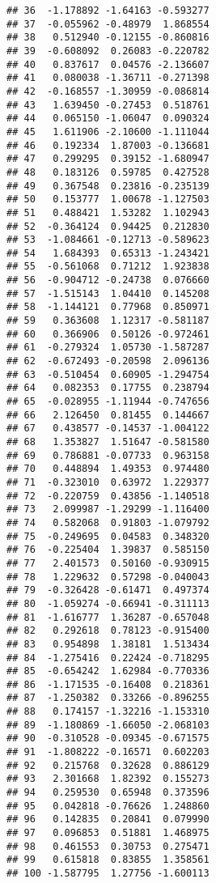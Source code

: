 \documentclass[12pt,a4paper]{scrartcl}\usepackage[]{graphicx}\usepackage[]{color}
\makeatletter
\newenvironment{kframe}{%
 \def\at@end@of@kframe{}%
 \ifinner\ifhmode%
  \def\at@end@of@kframe{\end{minipage}}%
  \begin{minipage}{\columnwidth}%
 \fi\fi%
 \def\FrameCommand##1{\hskip\@totalleftmargin \hskip-\fboxsep
 \colorbox{shadecolor}{##1}\hskip-\fboxsep
     \hskip-\linewidth \hskip-\@totalleftmargin \hskip\columnwidth}%
 \MakeFramed {\advance\hsize-\width
   \@totalleftmargin\z@ \linewidth\hsize
   \@setminipage}}%
 {\par\unskip\endMakeFramed%
 \at@end@of@kframe}
\newenvironment{knitrout}{}{} %
\makeatother
\begin{document}
\begin{Answer}
\begin{knitrout}
\begin{kframe}
\begin{verbatim}
## 36  -1.178892 -1.64163 -0.593277
## 37  -0.055962 -0.48979  1.868554
## 38   0.512940 -0.12155 -0.860816
## 39  -0.608092  0.26083 -0.220782
## 40   0.837617  0.04576 -2.136607
## 41   0.080038 -1.36711 -0.271398
## 42  -0.168557 -1.30959 -0.086814
## 43   1.639450 -0.27453  0.518761
## 44   0.065150 -1.06047  0.090324
## 45   1.611906 -2.10600 -1.111044
## 46   0.192334  1.87003 -0.136681
## 47   0.299295  0.39152 -1.680947
## 48   0.183126  0.59785  0.427528
## 49   0.367548  0.23816 -0.235139
## 50   0.153777  1.00678 -1.127503
## 51   0.488421  1.53282  1.102943
## 52  -0.364124  0.94425  0.212830
## 53  -1.084661 -0.12713 -0.589623
## 54   1.684393  0.65313 -1.243421
## 55  -0.561068  0.71212  1.923838
## 56  -0.904712 -0.24738  0.076660
## 57  -1.515143  1.04410  0.145208
## 58  -1.144121  0.77968  0.850971
## 59   0.363608  1.12317 -0.581187
## 60   0.366906  0.50126 -0.972461
## 61  -0.279324  1.05730 -1.587287
## 62  -0.672493 -0.20598  2.096136
## 63  -0.510454  0.60905 -1.294754
## 64   0.082353  0.17755  0.238794
## 65  -0.028955 -1.11944 -0.747656
## 66   2.126450  0.81455  0.144667
## 67   0.438577 -0.14537 -1.004122
## 68   1.353827  1.51647 -0.581580
## 69   0.786881 -0.07733  0.963158
## 70   0.448894  1.49353  0.974480
## 71  -0.323010  0.63972  1.229377
## 72  -0.220759  0.43856 -1.140518
## 73   2.099987 -1.29299 -1.116400
## 74   0.582068  0.91803 -1.079792
## 75  -0.249695  0.04583  0.348320
## 76  -0.225404  1.39837  0.585150
## 77   2.401573  0.50160 -0.930915
## 78   1.229632  0.57298 -0.040043
## 79  -0.326428 -0.61471  0.497374
## 80  -1.059274 -0.66941 -0.311113
## 81  -1.616777  1.36287 -0.657048
## 82   0.292618  0.78123 -0.915400
## 83   0.954898  1.38181  1.513434
## 84  -1.275416  0.22424 -0.718295
## 85  -0.654242  1.62984 -0.770336
## 86  -1.171535 -0.16408  0.218361
## 87  -1.250382  0.33266 -0.896255
## 88   0.174157 -1.32216 -1.153310
## 89  -1.180869 -1.66050 -2.068103
## 90  -0.310528 -0.09345 -0.671575
## 91  -1.808222 -0.16571  0.602203
## 92   0.215768  0.32628  0.886129
## 93   2.301668  1.82392  0.155273
## 94   0.259530  0.65948  0.373596
## 95   0.042818 -0.76626  1.248860
## 96   0.142835  0.20841  0.079990
## 97   0.096853  0.51881  1.468975
## 98   0.461553  0.30753  0.275471
## 99   0.615818  0.83855  1.358561
## 100 -1.587795  1.27756 -1.600113
\end{verbatim}
\end{kframe}
\end{knitrout}
\end{Answer}
\clearpage
\end{document}
